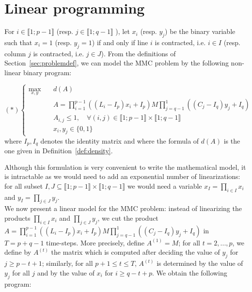 
\section{Linear programming}
\label{sec:linearprog}

For $i \in \llbracket 1; p-1 \rrbracket$ (resp.  $j \in \llbracket 1; q-1 \rrbracket$ ), let $x_i$ (resp. $y_j$) be the binary variable such that $x_i=1$ (resp. $y_j=1$) if and only if line $i$ is contracted, i.e. $i \in I$ (resp. column $j$ is contracted, i.e. $j \in J$). From the definitions of Section~\ref{sec:problemdef}, we can model the MMC problem by the following non-linear binary program:

\begin{equation*}
(\ast)\left\{
\begin{array}{lll}
\max\limits_{x,y}  \quad	& d(A)  \\
& A= \prod\limits_{i=1}^{p-1}((L_i-I_p)x_i+I_p)M\prod\limits_{j=q-1}^{1}((C_j-I_q)y_j+I_q) \\
& A_{i,j} \le 1, \quad \forall (i,j) \in \llbracket 1; p-1 \rrbracket \times \llbracket 1; q-1 \rrbracket \\
& x_i,y_j \in \{0,1\}
\end{array}\right.
\end{equation*}
where $I_p,I_q$ denotes the identity matrix and where the formula of $d(A)$ is the one given in Definition~\ref{def:density}.

\noindent Although this formulation is very convenient to write the mathematical model, it is intractable as we would need to add an exponential number of linearizations: for all subset $ I,J \subseteq \llbracket 1; p-1 \rrbracket \times \llbracket 1; q-1 \rrbracket$ we would need a variable $x_I=\prod\limits_{i \in I}x_i $ and $y_I=\prod\limits_{j \in J}y_j $.\\

\noindent We now present a linear model for the MMC problem: instead of linearizing the products $\prod\limits_{i \in I}x_i$ and $\prod\limits_{j \in J}y_j$, we cut the product \\
$A= \prod\limits_{i=1}^{p-1}((L_i-I_p)x_i+I_p)M\prod\limits_{j=q-1}^{1}((C_j-I_q)y_j+I_q) $ in $T=p+q-1$ time-steps. More precisely, define $A^{(1)}=M$; for all $t=2,...,p$, we define by $A^{(t)}$ the matrix which is computed after deciding the value of $y_j$ for $j \ge p-t+1$; similarly, for all $p+1\le t \le T$, $A^{(t)}$ is determined by the value of $y_j$ for all $j$ and by the value of $x_i$ for $i \ge q -t+p $. We obtain the following program:

